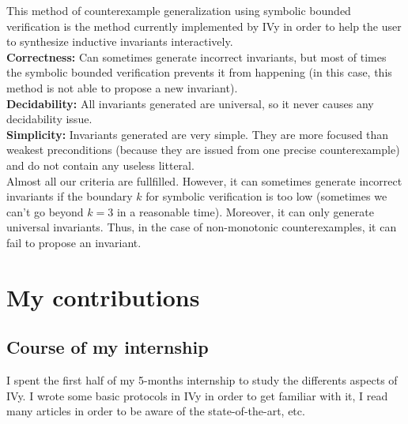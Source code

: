 \documentclass[11pt,a4paper,oldfontcommands,openany]{memoir}
\begin{document}
    This method of counterexample generalization using symbolic bounded verification is the method currently implemented by IVy in order to
    help the user to synthesize inductive invariants interactively.\\

    \textbf{Correctness:} Can sometimes generate incorrect invariants, but most of times the symbolic bounded verification prevents it from
    happening (in this case, this method is not able to propose a new invariant).\\

    \textbf{Decidability:} All invariants generated are universal, so it never causes any decidability issue.\\

    \textbf{Simplicity:} Invariants generated are very simple. They are more focused than weakest preconditions
    (because they are issued from one precise counterexample) and do not contain any useless litteral.\\

    Almost all our criteria are fullfilled. However, it can sometimes generate incorrect invariants if the boundary \(k\) for
    symbolic verification is too low (sometimes we can't go beyond \(k=3\) in a reasonable time).
    Moreover, it can only generate universal invariants. Thus, in the case of non-monotonic counterexamples, it can fail to propose an invariant.

\chapter{My contributions}

    \section{Course of my internship}

    I spent the first half of my 5-months internship to study the differents aspects of IVy. I wrote some basic protocols in IVy in order to get
    familiar with it, I read many articles in order to be aware of the state-of-the-art, etc.
\end{document}
